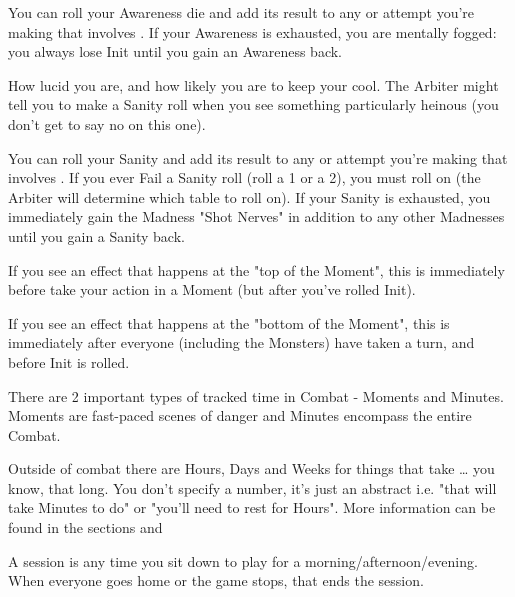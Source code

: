{You can roll your Awareness die and add its result to any \RO or \RB attempt you're making that involves \INT.  If your Awareness is exhausted, you are mentally fogged: you always lose Init until you gain an Awareness \UD back.



How lucid you are, and how likely you are to keep your cool.  The Arbiter might tell you to make a Sanity roll when you see something particularly heinous (you don't get to say no on this one).  

You can roll your Sanity \UD and add its result to any \RO or \RB attempt you're making that involves \FOC.  If you ever Fail a Sanity roll (roll a 1 or a 2), you must roll on  (the Arbiter will determine which table to roll on). If your Sanity is exhausted, you immediately gain the Madness "Shot Nerves" in addition to any other Madnesses until you gain a Sanity \UD back.

\newpage



If you see an effect that happens at the "top of the Moment", this is immediately before  take your  action in a Moment (but after you've rolled Init).

If you see an effect that happens at the "bottom of the Moment", this is immediately after everyone (including the Monsters) have taken a turn, and before Init is rolled.


There are 2 important types of tracked time in Combat - Moments and Minutes.  Moments are fast-paced scenes of danger and Minutes encompass the entire Combat.  



Outside of combat there are Hours, Days and Weeks for things that take … you know, that long.  You don't specify a number, it's just an abstract i.e. "that will take Minutes to do" or "you'll need to rest for Hours".  More information can be found in the sections  and 

A session is any time you sit down to play for a morning/afternoon/evening.  When everyone goes home or the game stops, that ends the session.


}
